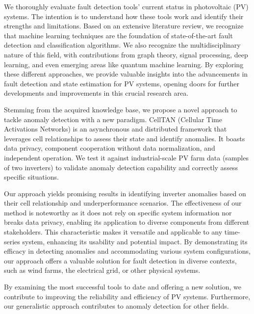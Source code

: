 We thoroughly evaluate fault detection tools' current status in photovoltaic (PV) systems. The intention is to understand how these tools work and identify their strengths and limitations. Based on an extensive literature review, we recognize that machine learning techniques are the foundation of state-of-the-art fault detection and classification algorithms. We also recognize the multidisciplinary nature of this field, with contributions from graph theory, signal processing, deep learning, and even emerging areas like quantum machine learning. By exploring these different approaches, we provide valuable insights into the advancements in fault detection and state estimation for PV systems, opening doors for further developments and improvements in this crucial research area.

Stemming from the acquired knowledge base, we propose a novel approach to tackle anomaly detection with a new paradigm. CellTAN (Cellular Time Activations Networks) is an asynchronous and distributed framework that leverages cell relationships to assess their state and identify anomalies. It boasts data privacy, component cooperation without data normalization, and independent operation.
We test it against industrial-scale PV farm data (samples of two inverters) to validate anomaly detection capability and correctly assess specific situations.


Our approach yields promising results in identifying inverter anomalies based on their cell relationship and underperformance scenarios. The effectiveness of our method is noteworthy as it does not rely on specific system information nor breaks data privacy, enabling its application to diverse components from different stakeholders. This characteristic makes it versatile and applicable to any time-series system, enhancing its usability and potential impact. By demonstrating its efficacy in detecting anomalies and accommodating various system configurations, our approach offers a valuable solution for fault detection in diverse contexts, such as wind farms, the electrical grid, or other physical systems.

By examining the most successful tools to date and offering a new solution, we contribute to improving the reliability and efficiency of PV systems. Furthermore, our generalistic approach contributes to anomaly detection for other fields.
